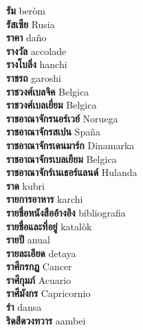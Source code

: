 \textbf{ รัม  } beròm \\
\textbf{ รัสเซีย  } Rusia \\
\textbf{ ราคา  } daño \\
\textbf{ รางวัล  } accolade \\
\textbf{ รางโบลิ่ง  } hanchi \\
\textbf{ ราชรถ  } garoshi \\
\textbf{ ราชวงศ์เบลจิค  } Belgica \\
\textbf{ ราชวงศ์เบลเยี่ยม  } Belgica \\
\textbf{ ราชอาณาจักรนอร์เวย์  } Noruega \\
\textbf{ ราชอาณาจักรสเปน  } Spaña \\
\textbf{ ราชอาณาจักรเดนมาร์ก  } Dinamarka \\
\textbf{ ราชอาณาจักรเบลเยียม  } Belgica \\
\textbf{ ราชอาณาจักร์เนเธอร์แลนด์  } Hulanda \\
\textbf{ ราด  } kubri \\
\textbf{ รายการอาหาร  } karchi \\
\textbf{ รายชื่อหนังสืออ้างอิง  } bibliografia \\
\textbf{ รายชื่อและที่อยู่  } katalòk \\
\textbf{ รายปี  } anual \\
\textbf{ รายละเอียด  } detaya \\
\textbf{ ราศีกรกฏ  } Cancer \\
\textbf{ ราศีกุมภ์  } Acuario \\
\textbf{ ราศีมังกร  } Capricornio \\
\textbf{ รำ  } dansa \\
\textbf{ ริดสีดวงทวาร  } aambei \\
